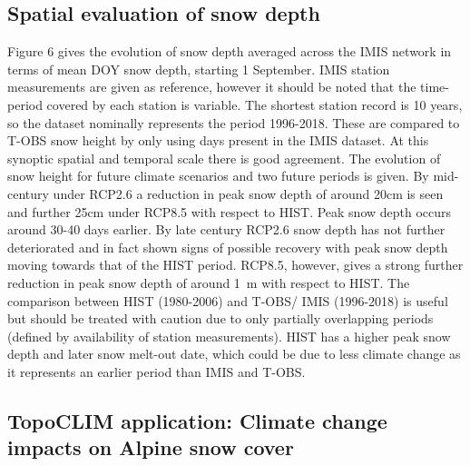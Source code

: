 \documentclass[hess, manuscript]{copernicus}
\begin{document}
\subsection{Spatial evaluation of snow depth}
Figure 6 gives the evolution of snow depth averaged across the IMIS network in terms of mean DOY snow depth, starting 1 September. IMIS station measurements are given as reference, however it should be noted that the time-period covered by each station is variable. The shortest station record is 10 years, so the dataset nominally represents the period 1996-2018. These are compared to T-OBS snow height by only using days present in the IMIS dataset. At this synoptic spatial and temporal scale there is good agreement. The evolution of snow height for future climate scenarios and two future periods is given. By mid-century under RCP2.6 a reduction in peak snow depth of around 20\unit{cm} is seen and further 25\unit{cm} under RCP8.5 with respect to HIST. Peak snow depth occurs around 30-40 days earlier. By late century RCP2.6 snow depth has not further deteriorated and in fact shown signs of possible recovery with peak snow depth moving towards that of the HIST period. RCP8.5, however, gives a strong further reduction in peak snow depth of around 1~m with respect to HIST.   
The comparison between HIST (1980-2006) and T-OBS/ IMIS (1996-2018) is useful but should be treated with caution due to only partially overlapping periods (defined by availability of station measurements). HIST has a higher peak snow depth and later snow melt-out date, which could be due to less climate change as it represents an earlier period than IMIS and T-OBS. 



\subsection{TopoCLIM application: Climate change impacts on Alpine snow cover}
\end{document}
